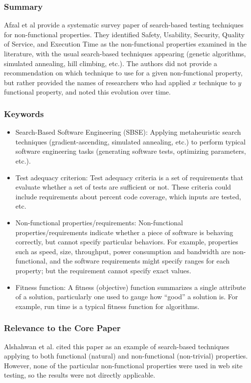 \documentclass{sig-alternate-05-2015}
\begin{document}
\subsubsection{Summary}
Afzal et al \cite{afzal2009systematic} provide a systematic survey paper of search-based testing techniques for non-functional properties. They identified Safety, Usability, Security, Quality of Service, and Execution Time as the non-functional properties examined in the literature, with the usual search-based techniques appearing (genetic algorithms, simulated annealing, hill climbing, etc.). The authors did not provide a recommendation on which technique to use for a given non-functional property, but rather provided the names of researchers who had applied $x$ technique to $y$ functional property, and noted this evolution over time. 

\subsubsection{Keywords}

\begin{itemize}
\item Search-Based Software Engineering (SBSE): Applying metaheuristic search techniques (gradient-ascending, simulated annealing, etc.) to perform typical software engineering tasks (generating software tests, optimizing parameters, etc.).
\item Test adequacy criterion: Test adequacy criteria is a set of requirements that evaluate whether a set of tests are sufficient or not. These criteria could include requirements about percent code coverage, which inputs are tested, etc.
\item Non-functional properties/requirements: Non-functional properties/requirements indicate whether a piece of software is behaving correctly, but cannot specify particular behaviors. For example, properties such as speed, size, throughput, power consumption and bandwidth are non-functional, and the software requirements might specify ranges for each property; but the requirement cannot specify exact values.
\item Fitness function: A fitness (objective) function summarizes a single attribute of a solution, particularly one used to gauge how ``good'' a solution is. For example, run time is a typical fitness function for algorithms.
\end{itemize}

\subsubsection{Relevance to the Core Paper}
Alshahwan et al. \cite{alshahwan2011automated} cited this paper as an example of search-based techniques applying to both functional (natural) and non-functional (non-trivial) properties. However, none of the particular non-functional properties were used in web site testing, so the results were not directly applicable. 
\end{document}
